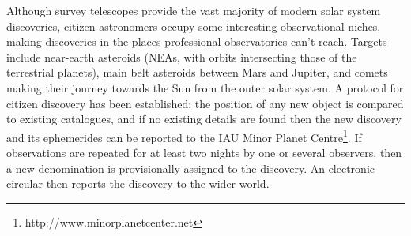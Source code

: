 \documentclass{ar2e}
\begin{document}
% 
% 
% 
%  
% 


% 


Although survey telescopes provide the vast majority of modern solar system
discoveries, citizen astronomers occupy some interesting observational niches,
making discoveries in the places professional observatories can't reach. Targets
include near-earth asteroids (NEAs, with orbits intersecting those of the
terrestrial planets), main belt asteroids between Mars and Jupiter, and comets
making their journey towards the Sun from the outer solar system. A protocol for
citizen discovery has been established: the position of any new object is
compared to existing catalogues, and if no existing details are found then the
new discovery and its ephemerides can be reported to the IAU Minor Planet
Centre\footnote{http://www.minorplanetcenter.net}.   If observations are
repeated for at least two nights by one or several observers, then a new
denomination is provisionally assigned to the discovery.   An electronic
circular then reports the discovery to the wider world.
\end{document}
